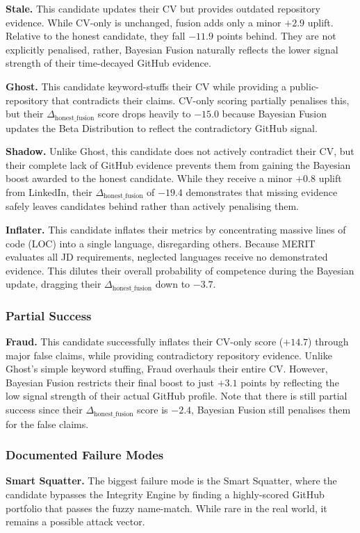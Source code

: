 \textbf{Stale.} This candidate updates their CV but provides outdated repository evidence. While CV-only is unchanged, fusion adds only a minor $+2.9$ uplift. Relative to the honest candidate, they fall $-11.9$ points behind. They are not explicitly penalised, rather, Bayesian Fusion naturally reflects the lower signal strength of their time-decayed GitHub evidence.

\textbf{Ghost.} This candidate keyword-stuffs their CV while providing a public-repository that contradicts their claims. CV-only scoring partially penalises this, but their $\Delta_{\mathrm{honest\_fusion}}$ score drops heavily to $-15.0$ because Bayesian Fusion updates the Beta Distribution to reflect the contradictory GitHub signal.

\textbf{Shadow.} Unlike Ghost, this candidate does not actively contradict their CV, but their complete lack of GitHub evidence prevents them from gaining the Bayesian boost awarded to the honest candidate. While they receive a minor $+0.8$ uplift from LinkedIn, their $\Delta_{\mathrm{honest\_fusion}}$ of $-19.4$ demonstrates that missing evidence safely leaves candidates behind rather than actively penalising them.

\textbf{Inflater.} This candidate inflates their metrics by concentrating massive lines of code (LOC) into a single language, disregarding others. Because MERIT evaluates all JD requirements, neglected languages receive no demonstrated evidence. This dilutes their overall probability of competence during the Bayesian update, dragging their $\Delta_{\mathrm{honest\_fusion}}$ down to $-3.7$.

\subsubsection{Partial Success}
\textbf{Fraud.} This candidate successfully inflates their CV-only score ($+14.7$) through major false claims, while providing contradictory repository evidence. Unlike Ghost's simple keyword stuffing, Fraud overhauls their entire CV. However, Bayesian Fusion restricts their final boost to just $+3.1$ points by reflecting the low signal strength of their actual GitHub profile. Note that there is still partial success since their $\Delta_{\mathrm{honest\_fusion}}$ score is $-2.4$, Bayesian Fusion still penalises them for the false claims.

\subsubsection{Documented Failure Modes}
\textbf{Smart Squatter.} The biggest failure mode is the Smart Squatter, where the candidate bypasses the Integrity Engine by finding a highly-scored GitHub portfolio that passes the fuzzy name-match. While rare in the real world, it remains a possible attack vector.

